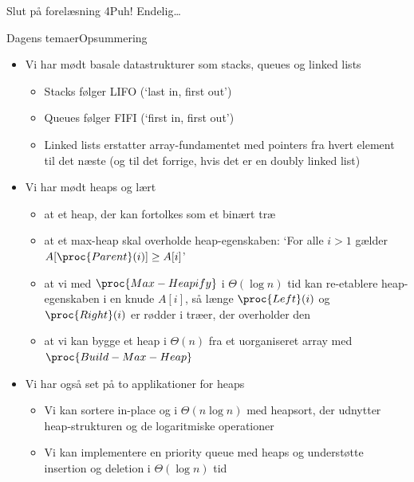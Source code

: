 \documentclass[aspectratio=1610]{beamer}
\begin{document}
\begin{frame}{Slut på forelæsning 4}{Puh!}
    Endelig\ldots
\end{frame}





\begin{frame}{Dagens temaer}{Opsummering}
    \begin{itemize}
        \small
        \item<1-> Vi har mødt basale datastrukturer som \alert{stacks},
            \alert{queues} og \alert{linked lists}
            \begin{itemize}
                \item Stacks følger LIFO (`last in, first out')
                \item Queues følger FIFI (`first in, first out')
                \item Linked lists erstatter array-fundamentet med pointers fra
                    hvert element til det næste (og til det forrige, hvis det er
                    en \alert{doubly linked list})
            \end{itemize}
        \item<2-> Vi har mødt \alert{heaps} og lært
            \begin{itemize}
                \item at et heap, der kan fortolkes som et binært træ
                \item at et \alert{max-heap} skal overholde
                    \alert{heap-egenskaben}: `For alle $i > 1$ gælder
                    $A[\proc{Parent}(i)] \geq A[i]$'
                \item at vi med \alert{$\proc{Max-Heapify}$} i $\Theta(\log n)$
                    tid kan re-etablere heap-egenskaben i en knude $A[i]$, så
                    længe $\proc{Left}(i)$ og $\proc{Right}(i)$ er rødder i
                    træer, der overholder den
                \item at vi kan bygge et heap i $\Theta(n)$ fra et uorganiseret
                    array med \alert{$\proc{Build-Max-Heap}$}
            \end{itemize}
        \item<3-> Vi har også set på to applikationer for heaps
            \begin{itemize}
                \item Vi kan sortere in-place og i $\Theta(n \log n)$ med
                    \alert{heapsort}, der udnytter heap-strukturen og de
                    logaritmiske operationer
                \item Vi kan implementere en \alert{priority queue} med heaps og
                    understøtte insertion og deletion i $\Theta(\log n)$ tid
            \end{itemize}
    \end{itemize}
\end{frame}
\end{document}
